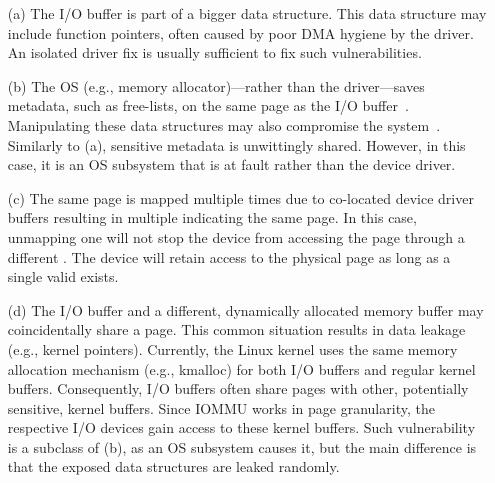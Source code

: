 \begin{enumerate}
    \item[(a)] The I/O buffer is part of a bigger data structure. This data structure may include function pointers, often caused by poor DMA hygiene by the driver. An isolated driver fix is usually sufficient to fix such vulnerabilities.
    \item[(b)] The OS (e.g., memory allocator)---rather than the driver---saves metadata, such as free-lists, on the same page as the I/O buffer~\cite{Cor07}. Manipulating these data structures may also compromise the system~\cite{ak09}. Similarly to (a), sensitive metadata is unwittingly shared. However, in this case, it is an OS subsystem that is at fault rather than the device driver.
    \item[(c)] The same page is mapped multiple times due to co-located device driver buffers resulting in multiple \iova{} indicating the same page. 
    In this case, unmapping one \iova will not stop the device from accessing the page through a different \iova.
    The device will retain access to the physical page as long as a single valid \iova{} exists.
    \item[(d)] The I/O buffer and a different, dynamically allocated memory buffer may coincidentally share a page. This common situation results in data leakage (e.g., kernel pointers). Currently, the Linux kernel uses the same memory allocation mechanism (e.g., kmalloc) for both I/O buffers and regular kernel buffers. Consequently, I/O buffers often share pages with other, potentially sensitive, kernel buffers. Since IOMMU works in page granularity, the respective I/O devices gain access to these kernel buffers. Such vulnerability is a subclass of (b), as an OS subsystem causes it, but the main difference is that the exposed data structures are leaked randomly.
\end{enumerate}

